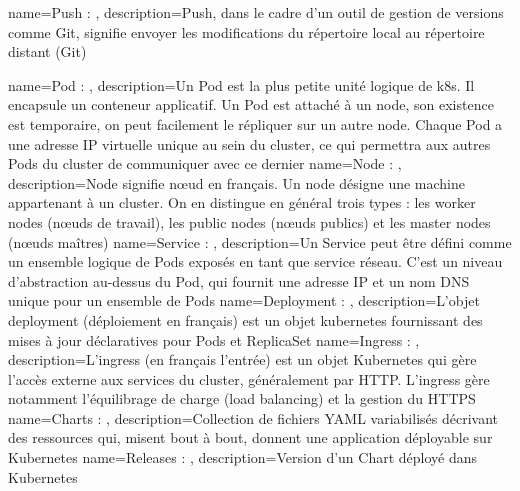 {
    name=Push : ,
    description={Push, dans le cadre d'un outil de gestion de versions comme Git, signifie envoyer les modifications du répertoire local au répertoire distant (Git)}
}

{
    name=Pod : ,
    description={Un Pod est la plus petite unité logique de k8s. Il encapsule un conteneur applicatif. Un Pod est attaché à un node, son existence est temporaire, on peut facilement le répliquer sur un autre node. Chaque Pod a une adresse IP virtuelle unique au sein du cluster, ce qui permettra aux autres Pods du cluster de communiquer avec ce dernier}
}
{
    name=Node : ,
    description={Node signifie nœud en français. Un node désigne une machine appartenant à un cluster. On en distingue en général trois types : les worker nodes (nœuds de travail), les public nodes (nœuds publics) et les master nodes (nœuds maîtres)}
}
{
    name=Service : ,
    description={Un Service peut être défini comme un ensemble logique de Pods exposés en tant que service réseau. C’est un niveau d’abstraction au-dessus du Pod, qui fournit une adresse IP et un nom DNS unique pour un ensemble de Pods}
}
{
    name=Deployment : ,
    description={L'objet deployment (déploiement en français) est un objet kubernetes fournissant des mises à jour déclaratives pour Pods et ReplicaSet}
}
{
    name=Ingress : ,
    description={L'ingress (en français l'entrée) est un objet Kubernetes qui gère l'accès externe aux services du cluster, généralement par HTTP. L'ingress gère notamment l'équilibrage de charge (load balancing) et la gestion du HTTPS}
}
{
    name=Charts : ,
    description={Collection de fichiers YAML variabilisés décrivant des ressources qui, misent bout à bout, donnent une application déployable sur Kubernetes}
}
{
    name=Releases : ,
    description={Version d'un Chart déployé dans Kubernetes}
}

